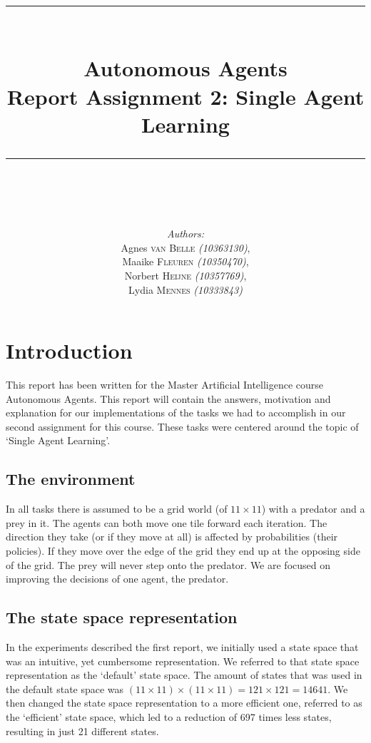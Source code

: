 \documentclass{article}
\newcommand{\HRule}{\rule{\linewidth}{0.1mm}}
\begin{document}
\title{ \HRule \\[0.2cm]
		Autonomous Agents\\ 
		Report Assignment 2: Single Agent Learning\\
		\HRule \\[0.1cm]
		}
		
\author{
		\emph{Authors:}\\[0.2cm]
		Agnes \textsc{van Belle} \small{ \emph{(10363130)}},\\ 
		Maaike \textsc{Fleuren} \small{ \emph{(10350470)}}, \\
		Norbert \textsc{Heijne} \small{ \emph{(10357769)}}, \\
		Lydia \textsc{Mennes} \small{ \emph{(10333843)}}
		}
		
\maketitle

\section{Introduction}
This report has been written for the Master Artificial Intelligence course Autonomous Agents. This report will contain the answers, motivation and explanation for our implementations of the tasks we had to accomplish in our second assignment for this course. These tasks were centered around the topic of `Single Agent Learning'.

\subsection{The environment} \label{sec:environment}
In all tasks there is assumed to be a grid world (of $11 \times 11$) with a predator and a prey in it. The agents can both move one tile forward each iteration. The direction they take (or if they move at all) is affected by probabilities (their policies). If they move over the edge of the grid they end up at the opposing side of the grid. The prey will never step onto the predator. We are focused on improving the decisions of one agent, the predator. 

\subsection{The state space representation} \label{sec:stateSpace}
In the experiments described the first report, we initially used a state space that was an intuitive, yet cumbersome representation. We referred to that state space representation as the `default' state space. The amount of states that was used in the default state space was $(11 \times 11) \times (11 \times 11) = 121 \times 121 = 14641$. We then changed the state space representation to a more efficient one, referred to as the `efficient' state space, which led to a reduction of 697 times less states, resulting in just 21 different states.
\end{document}
